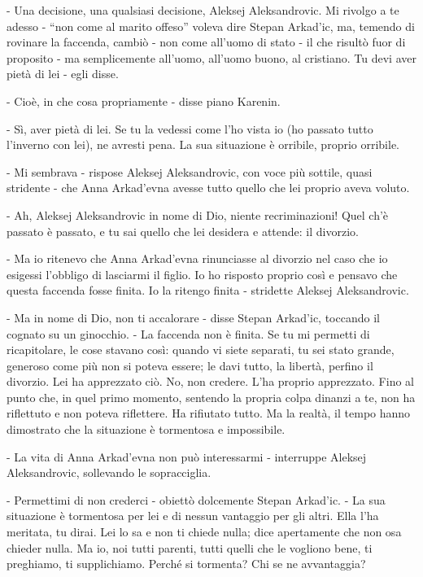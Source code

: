 - Una decisione, una qualsiasi decisione, Aleksej Aleksandrovic. Mi rivolgo a te adesso - ``non come al marito offeso'' voleva dire Stepan Arkad'ic, ma, temendo di rovinare la faccenda, cambiò - non come all'uomo di stato - il che risultò fuor di proposito - ma semplicemente all'uomo, all'uomo buono, al cristiano. Tu devi aver pietà di lei - egli disse. 

- Cioè, in che cosa propriamente - disse piano Karenin. 

- Sì, aver pietà di lei. Se tu la vedessi come l'ho vista io (ho passato tutto l'inverno con lei), ne avresti pena. La sua situazione è orribile, proprio orribile. 

- Mi sembrava - rispose Aleksej Aleksandrovic, con voce più sottile, quasi stridente - che Anna Arkad'evna avesse tutto quello che lei proprio aveva voluto. 

- Ah, Aleksej Aleksandrovic in nome di Dio, niente recriminazioni! Quel ch'è passato è passato, e tu sai quello che lei desidera e attende: il divorzio. 

- Ma io ritenevo che Anna Arkad'evna rinunciasse al divorzio nel caso che io esigessi l'obbligo di lasciarmi il figlio. Io ho risposto proprio così e pensavo che questa faccenda fosse finita. Io la ritengo finita - stridette Aleksej Aleksandrovic. 

- Ma in nome di Dio, non ti accalorare - disse Stepan Arkad'ic, toccando il cognato su un ginocchio. - La faccenda non è finita. Se tu mi permetti di ricapitolare, le cose stavano così: quando vi siete separati, tu sei stato grande, generoso come più non si poteva essere; le davi tutto, la libertà, perfino il divorzio. Lei ha apprezzato ciò. No, non credere. L'ha proprio apprezzato. Fino al punto che, in quel primo momento, sentendo la propria colpa dinanzi a te, non ha riflettuto e non poteva riflettere. Ha rifiutato tutto. Ma la realtà, il tempo hanno dimostrato che la situazione è tormentosa e impossibile. 

- La vita di Anna Arkad'evna non può interessarmi - interruppe Aleksej Aleksandrovic, sollevando le sopracciglia. 
\enlargethispage*{1\baselineskip}

- Permettimi di non crederci - obiettò dolcemente Stepan Arkad'ic. - La sua situazione è tormentosa per lei e di nessun vantaggio per gli altri. Ella l'ha meritata, tu dirai. Lei lo sa e non ti chiede nulla; dice apertamente che non osa chieder nulla. Ma io, noi tutti parenti, tutti quelli che le vogliono bene, ti preghiamo, ti supplichiamo. Perché si tormenta? Chi se ne avvantaggia? 

